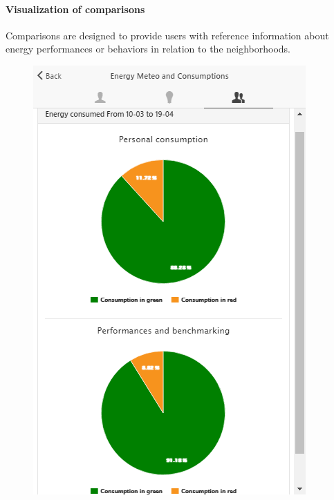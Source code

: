 \paragraph{Visualization of comparisons} 
Comparisons are designed to provide users with reference information about energy performances or behaviors in relation to the neighborhoods.
\begin{figure}[htb]
      \begin{center}
        \begin{minipage}[htb]{0.45\linewidth}    
         \includegraphics[width=1\linewidth]{img/touperformancechart_indivcoll.png}
        \end{minipage}
         \begin{minipage}[htb]{0.45\linewidth}    

\end{minipage}
\end{center}
\end{figure}

